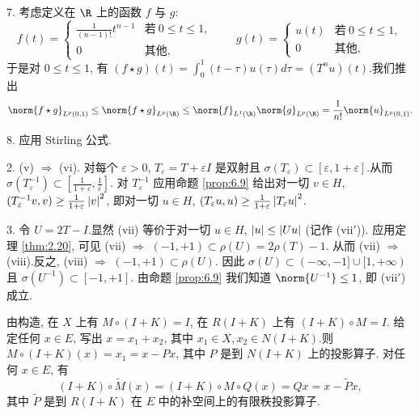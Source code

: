 7. 考虑定义在 $\R$ 上的函数 $f$ 与 $g$:
\begin{equation*}
f(t)=\begin{cases}\frac{1}{(n-1)!}t^{n-1} & \text{若}\ 0\le t\le1,\\ 0 & \text{其他},\end{cases}
\qquad
g(t)=\begin{cases}u(t) & \text{若}\ 0\le t\le1,\\ 0 & \text{其他},\end{cases}
\end{equation*}
于是对 $0\le t\le1$, 有
$(f\star g)(t)=\int_0^1(t-\tau)u(\tau)d\tau=(T^nu)(t)$.我们推出
\begin{equation*}
\norm{f\star g}_{L^p(0,1)}\le\norm{f\star g}_{L^p(\R)}\le\norm{f}_{L^1(\R)}\norm{g}_{L^p(\R)}
=\frac{1}{n!}\norm{u}_{L^p(0,1)}.
\end{equation*}

8. 应用 Stirling 公式.


2. (v) $\Rightarrow$ (vi). 对每个 $\varepsilon>0$, $T_\varepsilon=T+\varepsilon I$
是双射且 $\sigma(T_\varepsilon)\subset[\varepsilon,1+\varepsilon]$.从而
$\sigma(T_\varepsilon^{-1})\subset\left[\frac{1}{1+\varepsilon},\frac1\varepsilon\right]$.
对 $T_\varepsilon^{-1}$ 应用命题  \ref{prop:6.9} 给出对一切 $v\in H$,
$(T_\varepsilon^{-1}v,v)\ge\frac{1}{1+\varepsilon}\left|v\right|^2$, 即对一切 $u\in H$,
$(T_\varepsilon u,u)\ge\frac{1}{1+\varepsilon}\left|T_\varepsilon u\right|^2$.

3. 令 $U=2T-I$.显然 (vii) 等价于对一切 $u\in H$, $\left|u\right|\le\left|Uu\right|$ (记作 (vii$'$)).
应用定理  \ref{thm:2.20}, 可见 (vii) $\Rightarrow$ $(-1,+1)\subset\rho(U)=2\rho(T)-1$.
从而 (vii) $\Rightarrow$ (viii).反之, (viii) $\Rightarrow$ $(-1,+1)\subset\rho(U)$.
因此 $\sigma(U)\subset(-\infty,-1]\cup[1,+\infty)$ 且 $\sigma(U^{-1})\subset[-1,+1]$.
由命题  \ref{prop:6.9} 我们知道 $\norm{U^{-1}}\le1$, 即 (vii$'$) 成立.


由构造, 在 $X$ 上有 $M\circ(I+K)=I$, 在 $R(I+K)$ 上有 $(I+K)\circ M=I$.
给定任何 $x\in E$, 写出 $x=x_1+x_2$, 其中 $x_1\in X,x_2\in N(I+K)$.则
$M\circ(I+K)(x)=x_1=x-Px$, 其中 $P$ 是到 $N(I+K)$ 上的投影算子.
对任何 $x\in E$, 有
\begin{equation*}
(I+K)\circ\widetilde M(x)=(I+K)\circ M\circ Q(x)=Qx=x-\widetilde Px,
\end{equation*}
其中 $\widetilde P$ 是到 $R(I+K)$ 在 $E$ 中的补空间上的有限秩投影算子.

